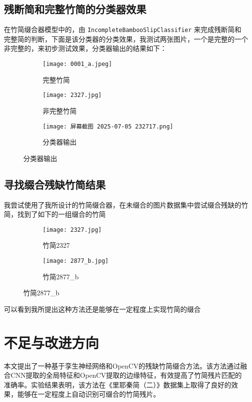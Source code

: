 \documentclass{article}
\begin{document}
\subsection{残断简和完整竹简的分类器效果}

在竹简缀合器模型中的，由 \texttt{IncompleteBambooSlipClassifier} 来完成残断简和完整简的判断，下面是该分类器的分类效果，我测试两张图片，一个是完整的一个非完整的，来初步测试效果，分类器输出的结果如下：
\begin{figure}[H]
\centering
\begin{subfigure}{0.3\textwidth}
\centering
\texttt{[image: 0001\_a.jpeg]}
\caption{完整竹简}
\end{subfigure}
\hfill
\begin{subfigure}{0.45\textwidth}
\centering
\texttt{[image: 2327.jpg]}
\caption{非完整竹简}
\end{subfigure}
\hfill
\begin{subfigure}{0.45\textwidth}
\centering
\texttt{[image: 屏幕截图 2025-07-05 232717.png]}
\caption{分类器输出}
\end{subfigure}
\end{figure}

\subsection{寻找缀合残缺竹简结果}

我尝试使用了我所设计的竹简缀合器，在未缀合的图片数据集中尝试缀合残缺的竹简，找到了如下的一组缀合的竹简
\begin{figure}[H]
\centering
\begin{subfigure}{0.45\textwidth}
\centering
\texttt{[image: 2327.jpg]}
\caption{竹简2327}
\end{subfigure}
\hfill
\begin{subfigure}{0.45\textwidth}
\centering
\texttt{[image: 2877\_b.jpg]}
\caption{竹简2877\_b}
\end{subfigure}
\end{figure}

可以看到我所提出这种方法还是能够在一定程度上实现竹简的缀合

\section{不足与改进方向}
本文提出了一种基于孪生神经网络和OpenCV的残缺竹简缀合方法。该方法通过融合CNN提取的全局特征和OpenCV提取的边缘特征，有效提高了竹简残片匹配的准确率。实验结果表明，该方法在《里耶秦简（二）》数据集上取得了良好的效果，能够在一定程度上自动识别可缀合的竹简残片。
\end{document}
